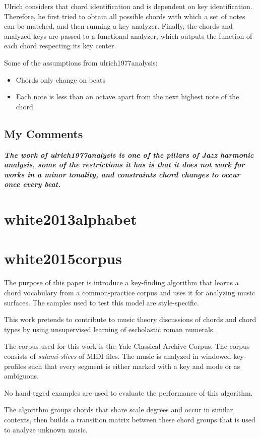 		Ulrich considers that chord identification and is dependent on key identification. Therefore, he first tried to obtain all possible chords with which a set of notes can be matched, and then running a key analyzer. Finally, the chords and analyzed keys are passed to a functional analyzer, which outputs the function of each chord respecting its key center.

		Some of the assumptions from ulrich1977analysis:
		\begin{itemize}
			\item Chords only change on beats
			\item Each note is less than an octave apart from the next highest note of the chord
		\end{itemize}

		\subsection{My Comments}
			\emph{\textbf{
				The work of ulrich1977analysis is one of the pillars of Jazz harmonic analysis, some of the restrictions it has is that it does not work for works in a minor tonality, and constraints chord changes to occur once every beat.
			}}
	\section{white2013alphabet }
	\section{white2015corpus }
		The purpose of this paper is introduce a key-finding algorithm that learns a chord vocabulary from a common-practice corpus and uses it for analyzing music surfaces. The samples used to test this model are style-specific.

		This work pretends to contribute to music theory discussions of chords and chord types by using unsupervised learning of escholastic roman numerals.

		The corpus used for this work is the Yale Classical Archive Corpus. The corpus consists of \emph{salami-slices} of MIDI files. The music is analyzed in windowed key-profiles such that every segment is either marked with a key and mode or as ambiguous.

		No hand-tgged examples are used to evaluate the performance of this algorithm.

		The algorithm groups chords that share scale degrees and occur in similar contexts, then builds a transition matrix between these chord groups that is used to analyze unknown music.


